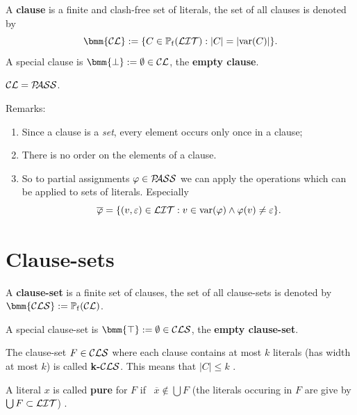 \documentclass[12pt]{book}
\begin{document}
\begin{defi}\label{def:cl}
  A \textbf{clause} is a finite and clash-free set of literals, the set of all clauses is denoted by
  \begin{displaymath}
    \bmm{\Cl} := \set{C \in \pote(\Lit) : \abs{C} = \abs{\var(C)}}.
  \end{displaymath}
  A special clause is $\bmm{\bot} := \es \in \Cl$, the \textbf{empty clause}.
\end{defi}

\begin{lem}\label{lem::CLPASS}
  $\mathcal{CL} = \mathcal{P\hspace{-0.32em}ASS}$.
\end{lem}
Remarks:
\begin{enumerate}
\item Since a clause is a \textit{set}, every element occurs only once in a clause;
\item There is no order on the elements of a clause.
\item So to partial assignments $\varphi \in \mathcal{P\hspace{-0.32em}ASS}$ we can apply the operations which can be applied to sets of literals. Especially
  \begin{displaymath}
    \overline{\varphi} = \{ (v,\varepsilon) \in \mathcal{LIT} : v \in \operatorname{var}(\varphi) \wedge \varphi(v) \ne \varepsilon \}.
  \end{displaymath}
\end{enumerate}

\section{Clause-sets}
\label{sec:cls}

\begin{defi}\label{def:cls}
  A \textbf{clause-set} is a finite set of clauses, the set of all clause-sets is denoted by $\bmm{\Cls} := \pote(\Cl)$.

  A special clause-set is $\bmm{\top} := \es \in \Cls$, the \textbf{empty clause-set}.
\end{defi}

\begin{defi}\label{def:cls2}
The clause-set $F \in \mathcal{CLS}$ where each clause contains at most $k$ literals (has width at most $k$) is called \textbf{k-}$\mathcal{CLS}$.
This means that $\mid C \mid \leq k$ \cite{h5}.
\end{defi}

\begin{defi}\label{def:cls2}
A literal $x$ is called \textbf{pure} for $F$ if \ $\overline{x} \not \in \bigcup F$ 
 (the literals occuring in $F$ are give by $\bigcup F \subset \mathcal{LIT}$) \cite{h5}.
\end{defi}
\end{document}
